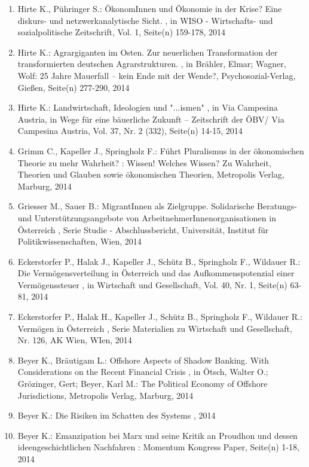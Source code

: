 \begin{enumerate}[leftmargin=*, labelsep=0.5cm]
	 \item Hirte K., Pühringer S.:  ÖkonomInnen und Ökonomie in der Krise? Eine diskurs- und netzwerkanalytische Sicht.  , in WISO - Wirtschafts- und sozialpolitische Zeitschrift, Vol. 1, Seite(n) 159-178, 2014
	 \item Hirte K.:  Agrargiganten im Osten. Zur neuerlichen Transformation der transformierten deutschen Agrarstrukturen.  , in Brähler, Elmar; Wagner, Wolf: 25 Jahre Mauerfall – kein Ende mit der Wende?, Psychosozial-Verlag, Gießen, Seite(n) 277-­290, 2014
	 \item Hirte K.:  Landwirtschaft, Ideologien und "...ismen"  , in Via Campesina Austria, in Wege für eine bäuerliche Zukunft – Zeitschrift der ÖBV/ Via Campesina Austria, Vol. 37, Nr. 2 (332), Seite(n) 14-15, 2014
	 \item Grimm C., Kapeller J., Springholz F.:  Führt Pluralismus in der ökonomischen Theorie zu mehr Wahrheit?  : Wissen! Welches Wissen? Zu Wahrheit, Theorien und Glauben sowie ökonomischen Theorien, Metropolis Verlag, Marburg, 2014
	 \item Griesser M., Sauer B.:  MigrantInnen als Zielgruppe. Solidarische Beratungs- und Unterstützungsangebote von ArbeitnehmerInnenorganisationen in Österreich  , Serie Studie - Abschlussbericht, Universität, Institut für Politikwissenschaften, Wien, 2014
	 \item Eckerstorfer P., Halak J., Kapeller J., Schütz B., Springholz F., Wildauer R.:  Die Vermögensverteilung in Österreich und das Aufkommenspotenzial einer Vermögenssteuer  , in Wirtschaft und Gesellschaft, Vol. 40, Nr. 1, Seite(n) 63-81, 2014
	 \item Eckerstorfer P., Halak H., Kapeller J., Schütz B., Springholz F., Wildauer R.:  Vermögen in Österreich  , Serie Materialien zu Wirtschaft und Gesellschaft, Nr. 126, AK Wien, WIen, 2014
	 \item Beyer K., Bräutigam L.:  Offshore Aspects of Shadow Banking. With Considerations on the Recent Financial Crisis  , in Ötsch, Walter O.; Grözinger, Gert; Beyer, Karl M.: The Political Economy of Offshore Jurisdictions, Metropolis Verlag, Marburg, 2014
	 \item Beyer K.:  Die Risiken im Schatten des Systems  , 2014
	 \item Beyer K.:  Emanzipation bei Marx und seine Kritik an Proudhon und dessen ideengeschichtlichen Nachfahren  : Momentum Kongress Paper, Seite(n) 1-18, 2014
\end{enumerate} 
